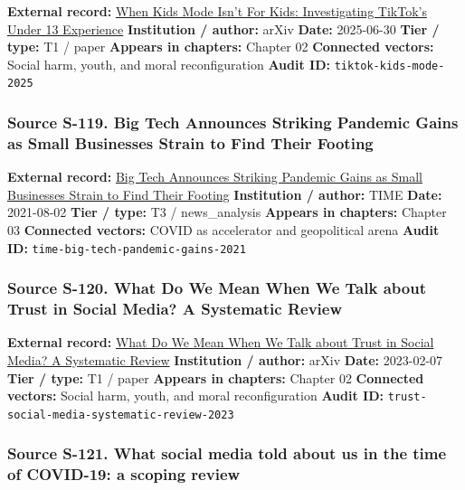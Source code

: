 \documentclass[
  american,
  11pt,
  letterpaper,
]{article}
\begin{document}
\textbf{External record:} \href{https://arxiv.org/abs/2507.00299}{When
Kids Mode Isn't For Kids: Investigating TikTok's Under 13 Experience}
\textbf{Institution / author:} arXiv \textbf{Date:} 2025-06-30
\textbf{Tier / type:} T1 / paper \textbf{Appears in chapters:} Chapter
02 \textbf{Connected vectors:} Social harm, youth, and moral
reconfiguration \textbf{Audit ID:} \texttt{tiktok-kids-mode-2025}

\subsubsection{Source S-119. Big Tech Announces Striking Pandemic Gains
as Small Businesses Strain to Find Their
Footing}\label{source-s-119-big-tech-announces-striking-pandemic-gains-as-small-businesses-strain-to-find-their-footing}

\textbf{External record:}
\href{https://time.com/6085674/big-tech-apple-microsoft-facebook-amazon-google-earnings/}{Big
Tech Announces Striking Pandemic Gains as Small Businesses Strain to
Find Their Footing} \textbf{Institution / author:} TIME \textbf{Date:}
2021-08-02 \textbf{Tier / type:} T3 / news\_analysis \textbf{Appears in
chapters:} Chapter 03 \textbf{Connected vectors:} COVID as accelerator
and geopolitical arena \textbf{Audit ID:}
\texttt{time-big-tech-pandemic-gains-2021}

\subsubsection{Source S-120. What Do We Mean When We Talk about Trust in
Social Media? A Systematic
Review}\label{source-s-120-what-do-we-mean-when-we-talk-about-trust-in-social-media-a-systematic-review}

\textbf{External record:} \href{https://arxiv.org/abs/2302.03671}{What
Do We Mean When We Talk about Trust in Social Media? A Systematic
Review} \textbf{Institution / author:} arXiv \textbf{Date:} 2023-02-07
\textbf{Tier / type:} T1 / paper \textbf{Appears in chapters:} Chapter
02 \textbf{Connected vectors:} Social harm, youth, and moral
reconfiguration \textbf{Audit ID:}
\texttt{trust-social-media-systematic-review-2023}

\subsubsection{Source S-121. What social media told about us in the time
of COVID-19: a scoping
review}\label{source-s-121-what-social-media-told-about-us-in-the-time-of-covid-19-a-scoping-review}
\end{document}
